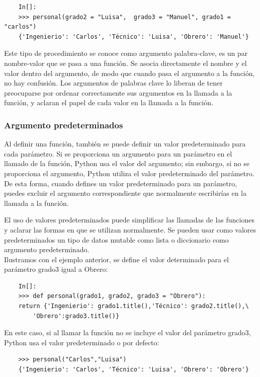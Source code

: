 \begin{lstlisting}
	In[]:	
	>>> personal(grado2 = "Luisa",  grado3 = "Manuel", grado1 = "carlos")
	{'Ingenierio': 'Carlos', 'Técnico': 'Luisa', 'Obrero': 'Manuel'}
\end{lstlisting}


Este tipo de procedimiento se conoce como argumento  palabra-clave, es un par nombre-valor que se pasa a una función. 
Se  asocia directamente el nombre y el valor dentro del argumento, de modo que cuando pasa el argumento a la función, 
no hay confusión. Los argumentos de palabras clave lo liberan de tener preocuparse por ordenar correctamente sus
argumentos en la llamada a la función, y aclaran el papel de cada valor en la llamada a la función.


\subsubsection{Argumento predeterminados}

Al definir una función, también se puede definir un valor predeterminado para cada parámetro. Si se proporciona un argumento para un parámetro en el llamado de la función, Python usa el valor del argumento; sin embargo, si no se proporciona el argumento, Python utiliza el valor predeterminado del parámetro.  De esta forma, cuando defines un valor predeterminado para un parámetro, puedes excluir el argumento correspondiente que normalmente escribirías en la llamada a la función. 

El uso de valores predeterminados puede simplificar las llamadas de las funciones y aclarar las formas en que se utilizan normalmente.
Se pueden usar como valores predeterminados  un tipo de datos mutable como lista o diccionario como argumento predeterminado.\\

Ilustramos con el ejemplo anterior, se define el valor determinado para el parámetro {\ttfamily grado3} igual a {\ttfamily Obrero}:

\begin{lstlisting}
	In[]:
	>>> def personal(grado1, grado2, grado3 = "Obrero"):
	return {'Ingenierio': grado1.title(),'Técnico': grado2.title(),\
		'Obrero':grado3.title()}
\end{lstlisting}

En este caso, si  al llamar la función no se incluye el valor del parámetro {\ttfamily grado3}, Python usa el valor predeterminado o por defecto:
\begin{lstlisting}
	>>> personal("Carlos","Luisa")
	{'Ingenierio': 'Carlos', 'Técnico': 'Luisa', 'Obrero': 'Obrero'}
\end{lstlisting}  

